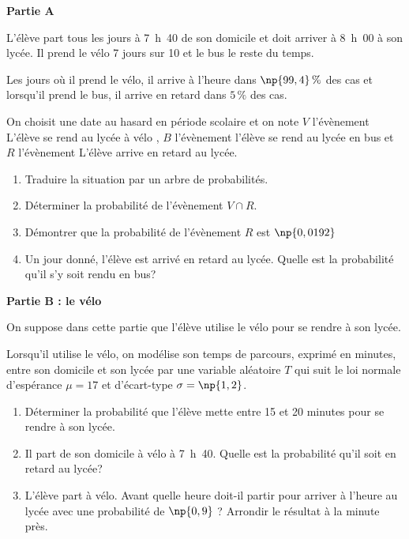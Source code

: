 \documentclass[10pt]{article}
\begin{document}
\medskip

\textbf{Partie A}

\medskip

L'élève part tous les jours à 7~h~40 de son domicile et doit arriver à 8~h~00 à son lycée. Il prend le vélo 7 jours sur 10 et le bus le reste du temps.

Les jours où il prend le vélo, il arrive à l'heure dans $\np{99,4}\,\%$ des cas et lorsqu'il prend le bus, il arrive en retard dans $5\,\%$ des cas.

On choisit une date au hasard en période scolaire et on note $V$ l'évènement 
\og L'élève se rend au lycée à vélo \fg, $B$ l'évènement \og l'élève se rend au lycée en bus \fg{} et $R$ l'évènement \og L'élève arrive en retard au lycée\fg.

\medskip

\begin{enumerate}
\item Traduire la situation par un arbre de probabilités.
\item Déterminer la probabilité de l'évènement $V \cap R$.
\item Démontrer que la probabilité de l'évènement $R$ est $\np{0,0192}$
\item Un jour donné, l'élève est arrivé en retard au lycée. Quelle est la probabilité qu'il s'y soit rendu en bus?
\end{enumerate}
\medskip

\textbf{Partie B : le vélo}

\medskip

On suppose dans cette partie que l'élève utilise le vélo pour se rendre à son lycée.

Lorsqu'il utilise le vélo, on modélise son temps de parcours, exprimé en minutes, entre son domicile et son lycée par une variable aléatoire $T$ qui suit le loi normale d'espérance $\mu = 17$ et d'écart-type $\sigma = \np{1,2}$.

\medskip

\begin{enumerate}
\item Déterminer la probabilité que l'élève mette entre 15 et 20 minutes pour se rendre à son lycée.
\item Il part de son domicile à vélo à 7~h~40. Quelle est la probabilité qu'il soit en retard au lycée?
\item L'élève part à vélo. Avant quelle heure doit-il partir pour arriver à l'heure au lycée avec une probabilité de $\np{0,9}$ ? Arrondir le résultat à la minute près.
\end{enumerate}
\end{document}
